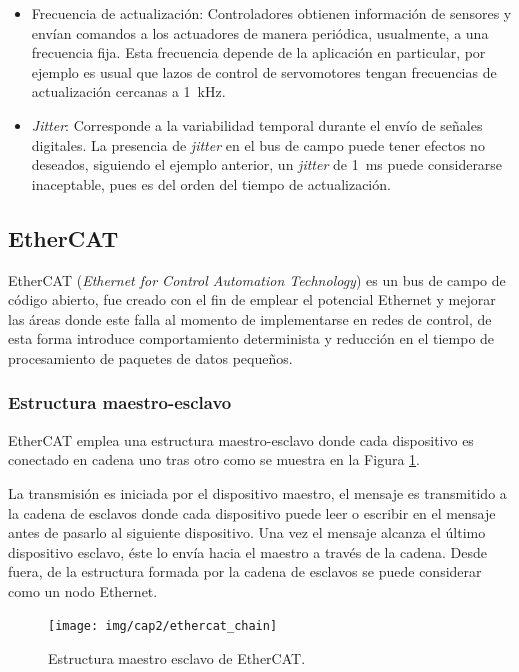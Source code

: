 \begin{itemize}

\item Frecuencia de actualización: Controladores obtienen información de sensores y envían comandos a los actuadores de manera periódica, usualmente, a una frecuencia fija. Esta frecuencia depende de la aplicación en particular, por ejemplo es usual que lazos de control de servomotores tengan frecuencias de actualización cercanas a \SI{1}{kHz}.

\item \textit{Jitter}: Corresponde a la variabilidad temporal durante el envío de señales digitales. La presencia de \textit{jitter} en el bus de campo puede tener efectos no deseados, siguiendo el ejemplo anterior, un \textit{jitter} de \SI{1}{\milli\second} puede considerarse inaceptable, pues es del orden del tiempo de actualización.

\end{itemize}


\subsection{EtherCAT}

EtherCAT (\textit{Ethernet for Control Automation Technology}) es un bus de campo de código abierto, fue creado con el fin de emplear el potencial Ethernet y mejorar las áreas donde este falla al momento de implementarse en redes de control, de esta forma introduce comportamiento determinista y reducción en el tiempo de procesamiento de paquetes de datos pequeños.

\subsubsection{Estructura maestro-esclavo}

EtherCAT emplea una estructura maestro-esclavo donde cada dispositivo es conectado en cadena uno tras otro como se muestra en la Figura \ref{cap2_ethercat_chain}.

La transmisión es iniciada por el dispositivo maestro, el mensaje es transmitido a la cadena de esclavos donde cada dispositivo puede leer o escribir en el mensaje antes de pasarlo al siguiente dispositivo. Una vez el mensaje alcanza el último dispositivo esclavo, éste lo envía hacia el maestro a través de la cadena. Desde fuera, de la estructura formada por la cadena de esclavos se puede considerar como un nodo Ethernet.

\begin{figure}[ht]
  \centering
  \texttt{[image: img/cap2/ethercat\_chain]}
  \caption{Estructura maestro esclavo de EtherCAT.}
  \label{cap2_ethercat_chain}
\end{figure}

